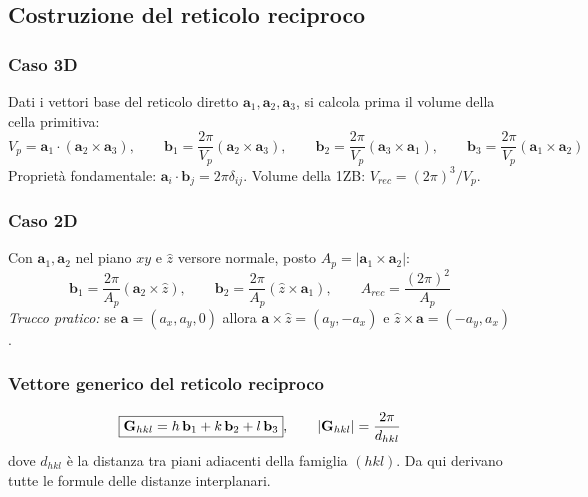 \subsection{Costruzione del reticolo reciproco}
\subsubsection*{Caso 3D}
Dati i vettori base del reticolo diretto $\mathbf{a}_1, \mathbf{a}_2, \mathbf{a}_3$, si calcola prima il volume della cella primitiva:
\[ V_p = \mathbf{a}_1 \cdot (\mathbf{a}_2 \times \mathbf{a}_3), \qquad  \mathbf{b}_1 = \frac{2\pi}{V_p} (\mathbf{a}_2 \times \mathbf{a}_3), \qquad
   \mathbf{b}_2 = \frac{2\pi}{V_p} (\mathbf{a}_3 \times \mathbf{a}_1), \qquad
   \mathbf{b}_3 = \frac{2\pi}{V_p} (\mathbf{a}_1 \times \mathbf{a}_2) \]
Proprietà fondamentale: $\mathbf{a}_i \cdot \mathbf{b}_j = 2\pi\delta_{ij}$. Volume della 1ZB: $V_{rec} = (2\pi)^3/V_p$.

\subsubsection*{Caso 2D}
Con $\mathbf{a}_1, \mathbf{a}_2$ nel piano $xy$ e $\hat z$ versore normale, posto $A_p = |\mathbf{a}_1 \times \mathbf{a}_2|$:
\[ \mathbf{b}_1 = \frac{2\pi}{A_p} (\mathbf{a}_2 \times \hat z), \qquad
   \mathbf{b}_2 = \frac{2\pi}{A_p} (\hat z \times \mathbf{a}_1), \qquad A_{rec} = \frac{(2\pi)^2}{A_p} \]
\textit{Trucco pratico:} se $\mathbf{a}=(a_x,a_y,0)$ allora $\mathbf{a}\times\hat z = (a_y, -a_x)$ e $\hat z \times \mathbf{a} = (-a_y, a_x)$.

\subsubsection*{Vettore generico del reticolo reciproco}
\[ \boxed{\mathbf{G}_{hkl} = h\,\mathbf{b}_1 + k\,\mathbf{b}_2 + l\,\mathbf{b}_3}, \qquad
   |\mathbf{G}_{hkl}| = \frac{2\pi}{d_{hkl}} \]
dove $d_{hkl}$ è la distanza tra piani adiacenti della famiglia $(hkl)$. Da qui derivano tutte le formule delle distanze interplanari.

